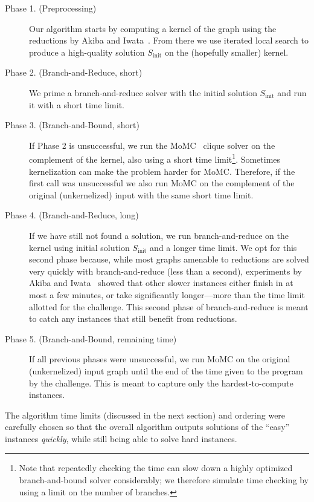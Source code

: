 \documentclass[twoside,leqno,twocolumn]{article}
\begin{document}
\begin{description}
\item[Phase 1. (Preprocessing)] Our algorithm starts by computing a kernel of the graph using the reductions by Akiba and Iwata~\cite{akiba-tcs-2016}. 
From there we use iterated local search to produce a high-quality solution $S_{\textrm{init}}$ on the (hopefully smaller) kernel. 
\item[Phase 2. (Branch-and-Reduce, short)]
We prime a branch-and-reduce solver with the initial solution $S_{\textrm{init}}$ and run it with a short time limit.
\item[Phase 3. (Branch-and-Bound, short)]
If Phase 2 is unsuccessful, we run the MoMC~\cite{DBLP:journals/cor/LiJM17} clique solver on the complement of the kernel, also using a short time limit\footnote{Note that repeatedly checking the time can slow down a highly optimized branch-and-bound solver considerably; we therefore simulate time checking by using a limit on the number of branches.}. Sometimes kernelization can make the problem harder for MoMC. Therefore, if the first call was unsuccessful we also run MoMC on the complement of the original (unkernelized) input with the same short time limit.

\item[Phase 4. (Branch-and-Reduce, long)]
If we have still not found a solution, we run branch-and-reduce on the kernel using initial solution $S_{\textrm{init}}$ and a longer time limit. We opt for this second phase because, while most graphs amenable to reductions are solved very quickly with branch-and-reduce (less than a second),
experiments by Akiba and Iwata~\cite{akiba-tcs-2016} showed that other slower instances either finish in at most a few minutes, or take significantly longer---more than the time limit allotted for the challenge. This second phase of branch-and-reduce is meant to catch any instances that still benefit from reductions.

\item[Phase 5. (Branch-and-Bound, remaining time)]
If all previous phases were unsuccessful, we run MoMC on the original (unkernelized) input graph until the end of the time given to the program by the challenge. This is meant to capture only the hardest-to-compute instances.
\end{description}

The algorithm time limits (discussed in the next section) and ordering were carefully chosen so that the overall algorithm outputs solutions of the ``easy'' instances \emph{quickly}, while still being able to solve hard instances.
\end{document}
